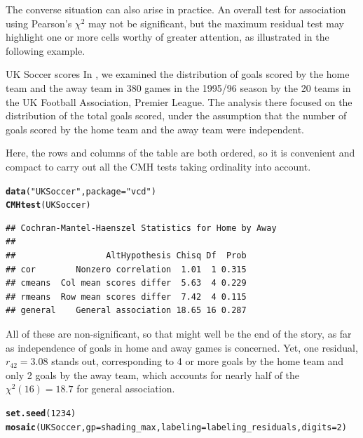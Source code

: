 \documentclass[11pt]{book}\usepackage[]{graphicx}\usepackage[]{color}
\makeatletter
\newcommand{\hlnum}[1]{\textcolor[rgb]{0.686,0.059,0.569}{#1}}%
\newcommand{\hlstr}[1]{\textcolor[rgb]{0.192,0.494,0.8}{#1}}%
\newcommand{\hlstd}[1]{\textcolor[rgb]{0.345,0.345,0.345}{#1}}%
\newcommand{\hlkwc}[1]{\textcolor[rgb]{0.333,0.667,0.333}{#1}}%
\newcommand{\hlkwd}[1]{\textcolor[rgb]{0.737,0.353,0.396}{\textbf{#1}}}%
\newenvironment{kframe}{%
 \def\at@end@of@kframe{}%
 \ifinner\ifhmode%
  \def\at@end@of@kframe{\end{minipage}}%
  \begin{minipage}{\columnwidth}%
 \fi\fi%
 \def\FrameCommand##1{\hskip\@totalleftmargin \hskip-\fboxsep
 \colorbox{shadecolor}{##1}\hskip-\fboxsep
     \hskip-\linewidth \hskip-\@totalleftmargin \hskip\columnwidth}%
 \MakeFramed {\advance\hsize-\width
   \@totalleftmargin\z@ \linewidth\hsize
   \@setminipage}}%
 {\par\unskip\endMakeFramed%
 \at@end@of@kframe}
\newenvironment{knitrout}{}{} %
\renewenvironment{knitrout}{\small\renewcommand{\baselinestretch}{.85}}{} %
\makeatother
\begin{document}
The converse situation can also arise in practice. An overall test for association
using Pearson's $\chi^2$ may not be significant, but the maximum residual test
may highlight one or more cells worthy of greater attention, as illustrated in
the following example.


\begin{Example}[soccer2]{UK Soccer scores}
In , we examined the distribution of goals scored
by the home team and the away team in 380 games in the 1995/96 season
by the 20 teams in the UK Football Association, Premier League.
The analysis there focused on the distribution of the total goals
scored, under the assumption that the number of goals scored by
the home team and the away team were independent.

Here, the rows and columns of the table  are both ordered,
so it is convenient and compact to carry out all the CMH tests taking
ordinality into account.
\begin{knitrout}
\color{fgcolor}\begin{kframe}
\begin{alltt}
\hlkwd{data}\hlstd{(}\hlstr{"UKSoccer"}\hlstd{,} \hlkwc{package}\hlstd{=}\hlstr{"vcd"}\hlstd{)}
\hlkwd{CMHtest}\hlstd{(UKSoccer)}
\end{alltt}
\begin{verbatim}
## Cochran-Mantel-Haenszel Statistics for Home by Away 
## 
##                  AltHypothesis Chisq Df  Prob
## cor        Nonzero correlation  1.01  1 0.315
## cmeans  Col mean scores differ  5.63  4 0.229
## rmeans  Row mean scores differ  7.42  4 0.115
## general    General association 18.65 16 0.287
\end{verbatim}
\end{kframe}
\end{knitrout}

All of these are non-significant, so that might well be the end of the story,
as far as independence of goals in home and away games is concerned. Yet, one
residual, $r_{42} = 3.08$ stands out, corresponding to 4 or more goals by
the home team and only 2 goals by the away team, which accounts for nearly
half of the $\chi^2 (16) = 18.7$ for general association.

\begin{knitrout}
\color{fgcolor}\begin{kframe}
\begin{alltt}
\hlkwd{set.seed}\hlstd{(}\hlnum{1234}\hlstd{)}
\hlkwd{mosaic}\hlstd{(UKSoccer,} \hlkwc{gp}\hlstd{=shading_max,} \hlkwc{labeling}\hlstd{=labeling_residuals,} \hlkwc{digits}\hlstd{=}\hlnum{2}\hlstd{)}
\end{alltt}
\end{kframe}\begin{figure}[htbp]



\end{figure}
\end{knitrout}
\end{Example}
\end{document}
